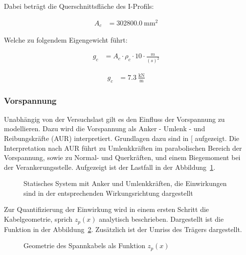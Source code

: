 \documentclass[
  11pt,
  letterpaper,
]{scrreprt}
\begin{document}
Dabei beträgt die Querschnittsfläche des I-Profils:

$$
\begin{aligned}
A_{c} &= 302800.0\ \mathrm{mm}^{2} \;
\end{aligned}
$$

Welche zu folgendem Eigengewicht führt:

$$
\begin{aligned}
g_{c} &= A_{c} \cdot \rho_{c} \cdot 10 \cdot \frac{ m }{ \left( s \right) ^{ 2 } } \; 
\end{aligned}
$$

$$
\begin{aligned}
g_{c} &= 7.3\ \frac{\mathrm{kN}}{\mathrm{m}} \;
\end{aligned}
$$

\subsubsection{Vorspannung}\label{vorspannung-1}

Unabhängig von der Versuchslast gilt es den Einfluss der Vorspannung zu
modellieren. Dazu wird die Vorspannung als Anker - Umlenk - und
Reibungskräfte (AUR) interpretiert. Grundlagen dazu sind in
{[}\citeproc{ref-thoma_vorspannung_2020}{6}{]} aufgezeigt. Die
Interpretation nach AUR führt zu Umlenkkräften im parabolischen Bereich
der Vorspannung, sowie zu Normal- und Querkräften, und einem Biegemoment
bei der Verankerungsstelle. Aufgezeigt ist der Lastfall in der
Abbildung~\ref{fig-t6_lastfall_p}.

\begin{figure}[H]


\caption{\label{fig-t6_lastfall_p}Statisches System mit Anker und
Umlenkkräften, die Einwirkungen sind in der entsprechenden
Wirkungsrichtung dargestellt}

\end{figure}%

Zur Quantifizierung der Einwirkung wird in einem ersten Schritt die
Kabelgeometrie, sprich \(z_p(x)\) analytisch beschrieben. Dargestellt
ist die Funktion in der Abbildung~\ref{fig-z_p_von_x}. Zusätzlich ist
der Umriss des Trägers dargestellt.

\begin{figure}[H]


\caption{\label{fig-z_p_von_x}Geometrie des Spannkabels als Funktion
\(z_p(x)\)}

\end{figure}%
\end{document}
